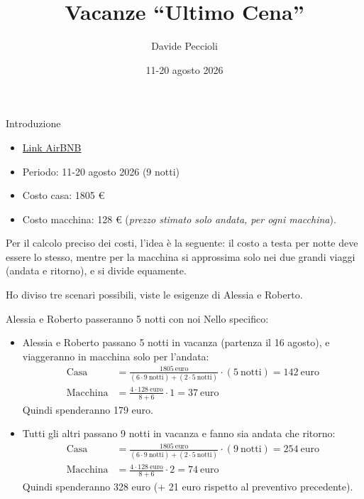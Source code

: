 \documentclass[8pt]{beamer}
\author{Davide Peccioli}
\date{11-20 agosto 2026}
\title{Vacanze ``Ultimo Cena''}
\begin{document}
\maketitle
\begin{frame}[label={sec:org99b306c}]{Introduzione}
\begin{itemize}
\item \href{https://www.airbnb.it/rooms/1243277132509758895?guests=8\&adults=8\&s=67\&unique\_share\_id=aba1fee1-90d0-4b31-bbef-b2b30f9853b1}{Link AirBNB}
\item Periodo: \alert{11-20 agosto 2026} (9 notti)
\item Costo casa: \alert{1805 €}
\item Costo macchina: 128 € (\emph{prezzo stimato solo andata, per ogni macchina}).
\end{itemize}

Per il calcolo preciso dei costi, l'idea è la seguente: il costo a testa per notte deve essere lo stesso, mentre per la macchina si approssima solo nei due grandi viaggi (andata e ritorno), e si divide equamente.

Ho diviso tre scenari possibili, viste le esigenze di Alessia e Roberto.
\end{frame}
\begin{frame}[label={sec:org23fbee0}]{Alessia e Roberto passeranno 5 notti con noi}
Nello specifico:
\begin{itemize}
\item \alert{Alessia e Roberto} passano 5 notti in vacanza (partenza il 16 agosto), e viaggeranno in macchina solo per l'andata:
\begin{align*}
  \text{Casa} &= \frac{1805\ \text{euro}}{(6 \cdot 9\ \text{notti}) + (2\cdot 5\ \text{notti})} \cdot (5\ \text{notti}) = 142 \ \text{euro}\\[2ex]
  \text{Macchina} &= \frac{4\cdot 128\ \text{euro}}{8 + 6} \cdot 1 = 37\ \text{euro}
\end{align*}
Quindi spenderanno \alert{179 euro}.
\item \alert{Tutti gli altri} passano 9 notti in vacanza e fanno sia andata che ritorno:
\begin{align*}
  \text{Casa} &= \frac{1805\ \text{euro}}{(6 \cdot 9\ \text{notti}) + (2\cdot 5\ \text{notti})} \cdot (9\ \text{notti}) = 254\ \text{euro}\\[2ex]
  \text{Macchina} &= \frac{4\cdot 128\ \text{euro}}{8 + 6} \cdot 2 = 74\ \text{euro}
\end{align*}
Quindi spenderanno \alert{328 euro} (+ 21 euro rispetto al preventivo precedente).
\end{itemize}
\end{frame}
\end{document}
